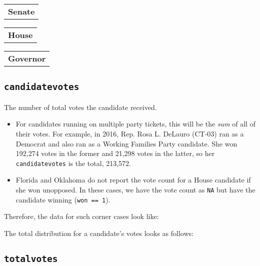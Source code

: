 \documentclass[12pt]{article}
\begin{document}
\begin{tabularx}{\linewidth}{C}
\textbf{Senate}\\

\end{tabularx}

\begin{tabularx}{\linewidth}{C}
\textbf{House}\\

\end{tabularx}

\begin{tabularx}{\linewidth}{C}
\textbf{Governor}\\

\end{tabularx}

\FloatBarrier

\subsection*{\texttt{candidatevotes}}

The number of total votes the candidate received.
\begin{itemize}
\item For candidates running on multiple party tickets, this will be the \emph{sum} of all of their votes.  For example, in 2016, Rep. Rosa L. DeLauro (CT-03) ran as a Democrat and also ran as a Working Families Party candidate. She won 192,274 votes in the former and 21,298 votes in the latter, so her \texttt{candidatevotes} is the total, 213,572.
\item  Florida and Oklahoma do not report the vote count for a House candidate if she won unopposed. In these cases, we have the vote count as \texttt{NA} but have the candidate winning (\texttt{won == 1}).
\end{itemize}

Therefore, the data for such corner cases look like:

\begin{table}[!h]
\centering
\footnotesize

\end{table}


The total distribution for a candidate's votes looks as follows:

\begin{table}[!h]
\centering
\footnotesize

\end{table}


\FloatBarrier

\subsection*{\texttt{totalvotes}}
\end{document}
